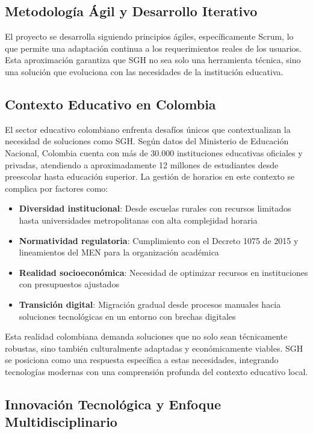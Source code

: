 \subsection{Metodología Ágil y Desarrollo Iterativo}

El proyecto se desarrolla siguiendo principios ágiles, específicamente Scrum, lo que permite una adaptación continua a los requerimientos reales de los usuarios. Esta aproximación garantiza que SGH no sea solo una herramienta técnica, sino una solución que evoluciona con las necesidades de la institución educativa.

\subsection{Contexto Educativo en Colombia}

El sector educativo colombiano enfrenta desafíos únicos que contextualizan la necesidad de soluciones como SGH. Según datos del Ministerio de Educación Nacional, Colombia cuenta con más de 30.000 instituciones educativas oficiales y privadas, atendiendo a aproximadamente 12 millones de estudiantes desde preescolar hasta educación superior. La gestión de horarios en este contexto se complica por factores como:

\begin{itemize}
\item \textbf{Diversidad institucional}: Desde escuelas rurales con recursos limitados hasta universidades metropolitanas con alta complejidad horaria
\item \textbf{Normatividad regulatoria}: Cumplimiento con el Decreto 1075 de 2015 y lineamientos del MEN para la organización académica
\item \textbf{Realidad socioeconómica}: Necesidad de optimizar recursos en instituciones con presupuestos ajustados
\item \textbf{Transición digital}: Migración gradual desde procesos manuales hacia soluciones tecnológicas en un entorno con brechas digitales
\end{itemize}

Esta realidad colombiana demanda soluciones que no solo sean técnicamente robustas, sino también culturalmente adaptadas y económicamente viables. SGH se posiciona como una respuesta específica a estas necesidades, integrando tecnologías modernas con una comprensión profunda del contexto educativo local.

\subsection{Innovación Tecnológica y Enfoque Multidisciplinario}


